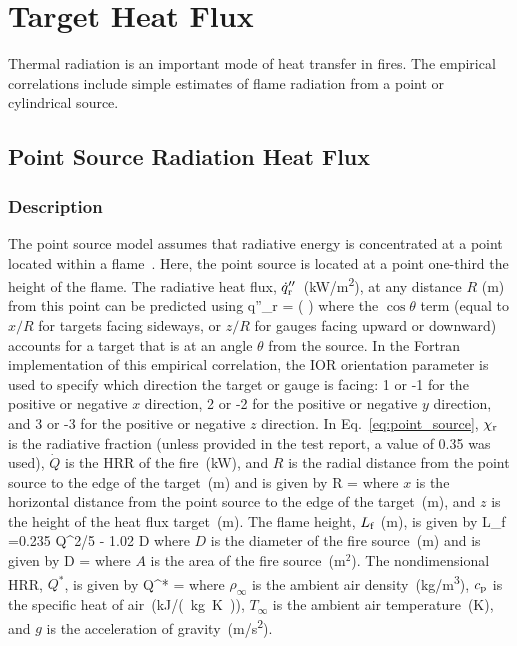 
\chapter{Target Heat Flux}
\label{Target_Heat_Flux_Chapter}

Thermal radiation is an important mode of heat transfer in fires. The empirical correlations include simple estimates of flame radiation from a point or cylindrical source.

\section{Point Source Radiation Heat Flux}
\label{sec:Point_Source_Radiation}

\subsection*{Description}

The point source model assumes that radiative energy is concentrated at a point located within a flame~\cite{Beyler2:SFPE}.
Here, the point source is located at a point one-third the height of the flame.
The radiative heat flux, $\dot q''_{\rm r}$~(\si{kW/m^2}), at any distance $R$ (\si{m}) from this point can be predicted using
\be
\dot q''_{\rm r} = \cos\theta \left(  \right)
\label{eq:point_source}
\ee
where the $\cos\theta$ term (equal to $x/R$ for targets facing sideways, or $z/R$ for gauges facing upward or downward) accounts for a target that is at an angle $\theta$ from the source. In the Fortran implementation of this empirical correlation, the IOR orientation parameter is used to specify which direction the target or gauge is facing: 1 or -1 for the positive or negative $x$ direction, 2 or -2 for the positive or negative $y$ direction, and 3 or -3 for the positive or negative $z$ direction. In Eq.~\ref{eq:point_source}, $\chi_{\rm r}$ is the radiative fraction (unless provided in the test report, a value of 0.35 was used), $\dot Q$ is the HRR of the fire~(\si{kW}), and $R$ is the radial distance from the point source to the edge of the target~(\si{m}) and is given by
\be
R = 
\label{eq:point_source_R}
\ee
where $x$ is the horizontal distance from the point source to the edge of the target~(\si{m}), and $z$ is the height of the heat flux target~(\si{m}). The flame height, $L_{\rm f}$ (\si{m}), is given by
\be
L_{\rm f} =0.235 Q^{2/5} - 1.02 D
\label{eq:point_source_Lf}
\ee
where $D$ is the diameter of the fire source~(\si{m}) and is given by
\be
D = 
\label{eq:point_source_D}
\ee
where $A$ is the area of the fire source~(m$^2$). The nondimensional HRR, $Q^*$, is given by
\be
Q^* = 
\label{eq:point_source_Qstar}
\ee
where $\rho_\infty$ is the ambient air density~(\si{kg/m^3}), $c_{\rm p}$ is the specific heat of air~(\si{kJ/(kg.K)}), $T_\infty$ is the ambient air temperature~(\si{K}), and $g$ is the acceleration of gravity~(\si{m/s^2}).

